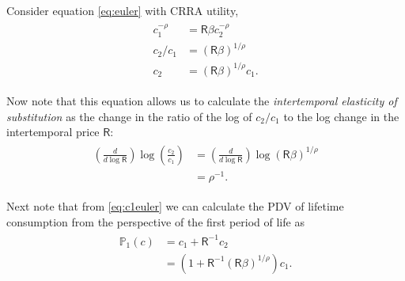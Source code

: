 \documentclass{scrartcl}
\begin{document}
  Consider equation \eqref{eq:euler} with CRRA utility,
  \begin{equation}\begin{gathered}\begin{aligned} \boldsymbol{\mathit{c}}_{1}^{-\rho} & = \mathsf{R}\beta \boldsymbol{\mathit{c}}_{2}^{-\rho} \\ \boldsymbol{\mathit{c}}_{2}/\boldsymbol{\mathit{c}}_{1} & = (\mathsf{R}\beta)^{1/\rho} \\ \boldsymbol{\mathit{c}}_{2} & = (\mathsf{R}\beta)^{1/\rho}\boldsymbol{\mathit{c}}_{1} \label{eq:c1euler}.
      \end{aligned}\end{gathered}\end{equation}

  Now note that this equation allows us to calculate the \textit{intertemporal elasticity of substitution} as the change in the ratio of the log of $\boldsymbol{\mathit{c}}_{2}/\boldsymbol{\mathit{c}}_{1}$ to the log change in the intertemporal price $\mathsf{R}$:
  \begin{equation}\begin{gathered}\begin{aligned} \left(\frac{d}{d \log \mathsf{R}}\right) \log \left(\frac{\boldsymbol{\mathit{c}}_{2}}{\boldsymbol{\mathit{c}}_{1}}\right) & = \left(\frac{d}{d \log \mathsf{R}}\right) \log (\mathsf{R} \beta)^{1/\rho} \\ & = \rho^{-1}.
      \end{aligned}\end{gathered}\end{equation}

  Next note that from \eqref{eq:c1euler} we can calculate the PDV of lifetime consumption from the perspective of the first period of life as
  \begin{equation}\begin{gathered}\begin{aligned} {\mathbb{P}}_{1}(\boldsymbol{\mathit{c}}) & = \boldsymbol{\mathit{c}}_{1} + \mathsf{R}^{-1}\boldsymbol{\mathit{c}}_{2} \\ & = \left(1+\mathsf{R}^{-1}(\mathsf{R}\beta)^{1/\rho}\right)\boldsymbol{\mathit{c}}_{1}.
      \end{aligned}\end{gathered}\end{equation}
\end{document}
